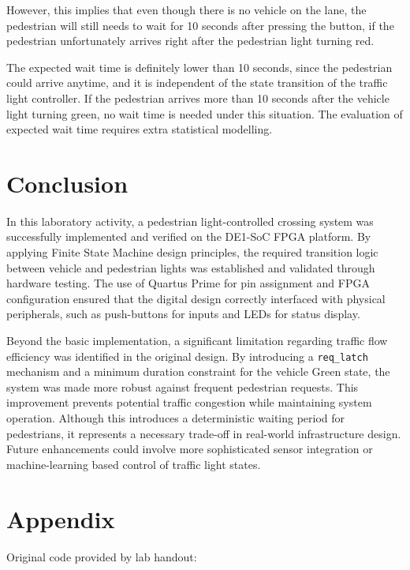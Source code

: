 \documentclass[12pt]{article}
\begin{document}
However, this implies that even though there is no vehicle on 
the lane, the pedestrian will still needs to wait
for 10 seconds after pressing the button, if the pedestrian
unfortunately arrives right after the pedestrian light 
turning red. 

The expected wait time is definitely lower
than 10 seconds, since the pedestrian could arrive 
anytime, and it is independent of the state transition
of the traffic light controller. If the pedestrian
arrives more than 10 seconds after the vehicle light 
turning green, no wait time is needed under 
this situation. The evaluation of expected wait time
requires extra statistical modelling.

\section{Conclusion}   

In this laboratory activity, a pedestrian 
light-controlled crossing system was 
successfully implemented and verified on 
the DE1-SoC FPGA platform. 
By applying Finite State Machine 
design principles, the required transition 
logic between vehicle 
and pedestrian lights was 
established and validated through hardware 
testing. The use of Quartus Prime for pin 
assignment and FPGA configuration ensured 
that the digital design correctly interfaced 
with physical peripherals, such as push-buttons 
for inputs and LEDs for status display.


Beyond the basic implementation, 
a significant limitation regarding 
traffic flow efficiency was identified 
in the original design. By introducing a 
 \verb|req_latch| mechanism and 
a minimum duration constraint for the 
vehicle Green state, the system was made 
more robust against frequent pedestrian 
requests. This improvement prevents
potential traffic congestion while 
maintaining system operation. 
Although this introduces a deterministic 
waiting period for pedestrians, it 
represents a necessary trade-off in 
real-world infrastructure design. 
Future enhancements could involve more 
sophisticated sensor integration or 
machine-learning based control of 
traffic light states.




\section{Appendix}
Original code provided by lab handout:
\end{document}

